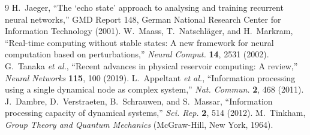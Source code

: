 \documentclass[aps,prapplied,reprint,amsmath,amssymb,floatfix]{revtex4-2}
\begin{document}
\begin{thebibliography}{9}
 H.~Jaeger, ``The `echo state' approach to analysing and
training recurrent neural networks,'' GMD Report 148, German National Research
Center for Information Technology (2001).
 W.~Maass, T.~Natschl\"ager, and H.~Markram, ``Real-time
computing without stable states: A new framework for neural computation based
on perturbations,'' \emph{Neural Comput.} \textbf{14}, 2531 (2002).
 G.~Tanaka \emph{et al.}, ``Recent advances in physical
reservoir computing: A review,'' \emph{Neural Networks} \textbf{115}, 100 (2019).
 L.~Appeltant \emph{et al.}, ``Information processing
using a single dynamical node as complex system,'' \emph{Nat. Commun.}
\textbf{2}, 468 (2011).
 J.~Dambre, D.~Verstraeten, B.~Schrauwen, and S.~Massar,
``Information processing capacity of dynamical systems,'' \emph{Sci. Rep.}
\textbf{2}, 514 (2012).
 M.~Tinkham, \emph{Group Theory and Quantum Mechanics}
(McGraw-Hill, New York, 1964).
\end{thebibliography}
\end{document}
